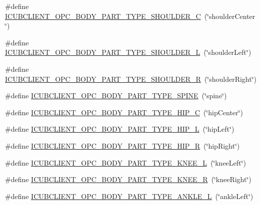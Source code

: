 \begin{DoxyCompactItemize}
\#define \hyperlink{group__icubclient__tags_gad28d9d48aa9da3eee85e3ab136e1d172}{I\+C\+U\+B\+C\+L\+I\+E\+N\+T\+\_\+\+O\+P\+C\+\_\+\+B\+O\+D\+Y\+\_\+\+P\+A\+R\+T\+\_\+\+T\+Y\+P\+E\+\_\+\+S\+H\+O\+U\+L\+D\+E\+R\+\_\+C}~(\char`\"{}shoulder\+Center\char`\"{})
\item 
\#define \hyperlink{group__icubclient__tags_gaa1a8f97d3e6094132e48f329d8d2e0fa}{I\+C\+U\+B\+C\+L\+I\+E\+N\+T\+\_\+\+O\+P\+C\+\_\+\+B\+O\+D\+Y\+\_\+\+P\+A\+R\+T\+\_\+\+T\+Y\+P\+E\+\_\+\+S\+H\+O\+U\+L\+D\+E\+R\+\_\+L}~(\char`\"{}shoulder\+Left\char`\"{})
\item 
\#define \hyperlink{group__icubclient__tags_ga4bda4a9f28859eeff000453a21b99884}{I\+C\+U\+B\+C\+L\+I\+E\+N\+T\+\_\+\+O\+P\+C\+\_\+\+B\+O\+D\+Y\+\_\+\+P\+A\+R\+T\+\_\+\+T\+Y\+P\+E\+\_\+\+S\+H\+O\+U\+L\+D\+E\+R\+\_\+R}~(\char`\"{}shoulder\+Right\char`\"{})
\item 
\#define \hyperlink{group__icubclient__tags_gadfd60827870d145a5ac23ee6876660a4}{I\+C\+U\+B\+C\+L\+I\+E\+N\+T\+\_\+\+O\+P\+C\+\_\+\+B\+O\+D\+Y\+\_\+\+P\+A\+R\+T\+\_\+\+T\+Y\+P\+E\+\_\+\+S\+P\+I\+NE}~(\char`\"{}spine\char`\"{})
\item 
\#define \hyperlink{group__icubclient__tags_ga5b66f7452f0824d540be80515b8a3cf3}{I\+C\+U\+B\+C\+L\+I\+E\+N\+T\+\_\+\+O\+P\+C\+\_\+\+B\+O\+D\+Y\+\_\+\+P\+A\+R\+T\+\_\+\+T\+Y\+P\+E\+\_\+\+H\+I\+P\+\_\+C}~(\char`\"{}hip\+Center\char`\"{})
\item 
\#define \hyperlink{group__icubclient__tags_ga5ad224603f5735d53f970eac5bd1ba0b}{I\+C\+U\+B\+C\+L\+I\+E\+N\+T\+\_\+\+O\+P\+C\+\_\+\+B\+O\+D\+Y\+\_\+\+P\+A\+R\+T\+\_\+\+T\+Y\+P\+E\+\_\+\+H\+I\+P\+\_\+L}~(\char`\"{}hip\+Left\char`\"{})
\item 
\#define \hyperlink{group__icubclient__tags_gafb4f4f5458f4914d1199fd44e3b3da50}{I\+C\+U\+B\+C\+L\+I\+E\+N\+T\+\_\+\+O\+P\+C\+\_\+\+B\+O\+D\+Y\+\_\+\+P\+A\+R\+T\+\_\+\+T\+Y\+P\+E\+\_\+\+H\+I\+P\+\_\+R}~(\char`\"{}hip\+Right\char`\"{})
\item 
\#define \hyperlink{group__icubclient__tags_ga3f3e6e7476a25bc15509b219f25c2a37}{I\+C\+U\+B\+C\+L\+I\+E\+N\+T\+\_\+\+O\+P\+C\+\_\+\+B\+O\+D\+Y\+\_\+\+P\+A\+R\+T\+\_\+\+T\+Y\+P\+E\+\_\+\+K\+N\+E\+E\+\_\+L}~(\char`\"{}knee\+Left\char`\"{})
\item 
\#define \hyperlink{group__icubclient__tags_gabb265e235a73a3a8890e93eb6aab1832}{I\+C\+U\+B\+C\+L\+I\+E\+N\+T\+\_\+\+O\+P\+C\+\_\+\+B\+O\+D\+Y\+\_\+\+P\+A\+R\+T\+\_\+\+T\+Y\+P\+E\+\_\+\+K\+N\+E\+E\+\_\+R}~(\char`\"{}knee\+Right\char`\"{})
\item 
\#define \hyperlink{group__icubclient__tags_gae2fe87aed7479cccc93d97d603707a53}{I\+C\+U\+B\+C\+L\+I\+E\+N\+T\+\_\+\+O\+P\+C\+\_\+\+B\+O\+D\+Y\+\_\+\+P\+A\+R\+T\+\_\+\+T\+Y\+P\+E\+\_\+\+A\+N\+K\+L\+E\+\_\+L}~(\char`\"{}ankle\+Left\char`\"{})

\end{DoxyCompactItemize}
